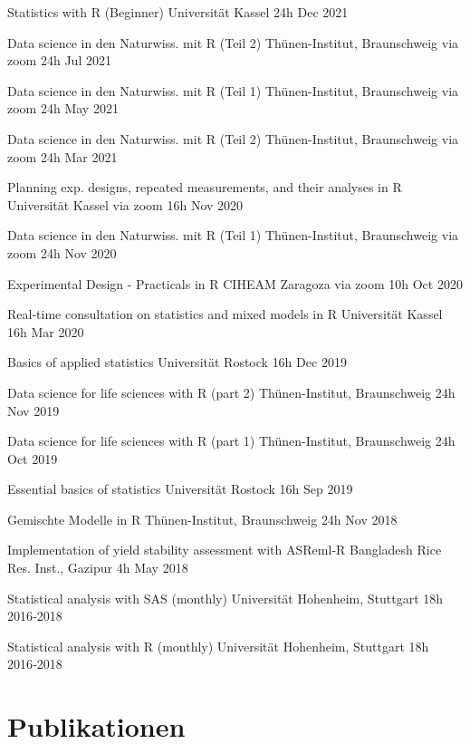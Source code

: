 \documentclass[11pt,a4paper,]{awesome-cv}
\begin{document}
\begin{cvhonors}
\cvhonor
{Statistics with R (Beginner)  }
{Universität Kassel}
{24h}
{Dec 2021  }

\cvhonor
{Data science in den Naturwiss. mit R (Teil 2)  }
{Thünen-Institut, Braunschweig via zoom}
{24h}
{Jul 2021  }

\cvhonor
{Data science in den Naturwiss. mit R (Teil 1)  }
{Thünen-Institut, Braunschweig via zoom}
{24h}
{May 2021  }

\cvhonor
{Data science in den Naturwiss. mit R (Teil 2)  }
{Thünen-Institut, Braunschweig via zoom}
{24h}
{Mar 2021  }

\cvhonor
{Planning exp. designs, repeated measurements, and their analyses in R  }
{Universität Kassel via zoom}
{16h}
{Nov 2020  }

\cvhonor
{Data science in den Naturwiss. mit R (Teil 1)  }
{Thünen-Institut, Braunschweig via zoom}
{24h}
{Nov 2020  }

\cvhonor
{Experimental Design - Practicals in R  }
{CIHEAM Zaragoza via zoom}
{10h}
{Oct 2020  }

\cvhonor
{Real‑time consultation on statistics and mixed models in R  }
{Universität Kassel}
{16h}
{Mar 2020  }

\cvhonor
{Basics of applied statistics  }
{Universität Rostock}
{16h}
{Dec 2019  }

\cvhonor
{Data science for life sciences with R (part 2)  }
{Thünen-Institut, Braunschweig}
{24h}
{Nov 2019  }

\cvhonor
{Data science for life sciences with R (part 1)  }
{Thünen-Institut, Braunschweig}
{24h}
{Oct 2019  }

\cvhonor
{Essential basics of statistics  }
{Universität Rostock}
{16h}
{Sep 2019  }

\cvhonor
{Gemischte Modelle in R  }
{Thünen-Institut, Braunschweig}
{24h}
{Nov 2018  }

\cvhonor
{Implementation of yield stability assessment with ASReml‑R  }
{Bangladesh Rice Res. Inst., Gazipur}
{4h}
{May 2018  }

\cvhonor
{Statistical analysis with SAS (monthly)  }
{Universität Hohenheim, Stuttgart}
{18h}
{2016‑2018  }

\cvhonor
{Statistical analysis with R (monthly)  }
{Universität Hohenheim, Stuttgart}
{18h}
{2016‑2018  }\end{cvhonors}

\hypertarget{publikationen}{%
\section{Publikationen}\label{publikationen}}
\end{document}

